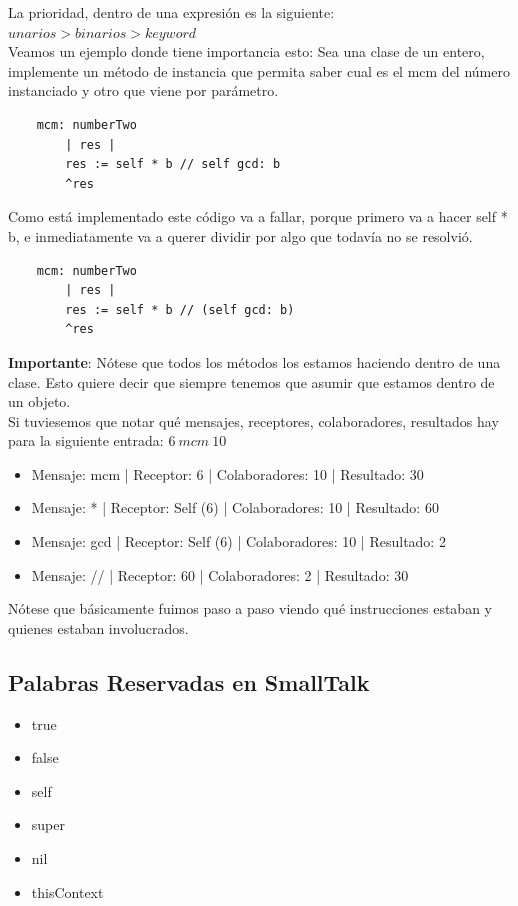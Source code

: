 \documentclass[10pt,a4paper]{article}
\begin{document}
La prioridad, dentro de una expresión es la siguiente: $unarios > binarios > keyword$ \\
Veamos un ejemplo donde tiene importancia esto: Sea una clase de un entero, implemente un método de instancia que permita saber cual es el mcm del número instanciado y otro que viene por parámetro. \\
\begin{lstlisting}
    mcm: numberTwo 
        | res | 
        res := self * b // self gcd: b
        ^res
\end{lstlisting}
Como está implementado este código va a fallar, porque primero va a hacer self * b, e inmediatamente va a querer dividir por algo que todavía no se resolvió. 
\begin{lstlisting}
    mcm: numberTwo 
        | res |
        res := self * b // (self gcd: b)
        ^res
\end{lstlisting}
\textbf{Importante}: Nótese que todos los métodos los estamos haciendo dentro de una clase. Esto quiere decir que siempre tenemos que asumir que estamos dentro de un objeto. \\
Si tuviesemos que notar qué mensajes, receptores, colaboradores, resultados hay para la siguiente entrada: $6 \ mcm \ 10 $
\begin{itemize}
    \item Mensaje: mcm | Receptor: 6 | Colaboradores: 10 | Resultado: 30
    \item Mensaje: * | Receptor: Self (6) | Colaboradores: 10 | Resultado: 60 
    \item Mensaje: gcd | Receptor: Self (6) | Colaboradores: 10 | Resultado: 2
    \item Mensaje: // | Receptor: 60 | Colaboradores: 2 | Resultado: 30 
\end{itemize}
Nótese que básicamente fuimos paso a paso viendo qué instrucciones estaban y quienes estaban involucrados. 
\subsection*{Palabras Reservadas en SmallTalk}
\begin{itemize}
    \item true
    \item false
    \item self
    \item super
    \item nil
    \item thisContext
\end{itemize}
\end{document}

